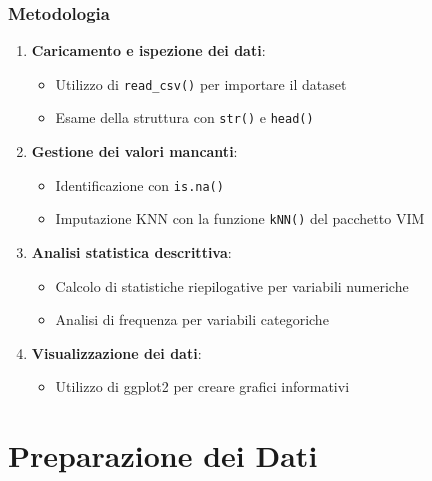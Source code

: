 \documentclass{beamer}
\begin{document}
\begin{frame}
\frametitle{Metodologia}
\begin{enumerate}
    \item \textbf{Caricamento e ispezione dei dati}:
    \begin{itemize}
        \item Utilizzo di \texttt{read\_csv()} per importare il dataset
        \item Esame della struttura con \texttt{str()} e \texttt{head()}
    \end{itemize}
    \item \textbf{Gestione dei valori mancanti}:
    \begin{itemize}
        \item Identificazione con \texttt{is.na()}
        \item Imputazione KNN con la funzione \texttt{kNN()} del pacchetto VIM
    \end{itemize}
    \item \textbf{Analisi statistica descrittiva}:
    \begin{itemize}
        \item Calcolo di statistiche riepilogative per variabili numeriche
        \item Analisi di frequenza per variabili categoriche
    \end{itemize}
    \item \textbf{Visualizzazione dei dati}:
    \begin{itemize}
        \item Utilizzo di ggplot2 per creare grafici informativi
    \end{itemize}
\end{enumerate}
\end{frame}

\section{Preparazione dei Dati}
\end{document}
